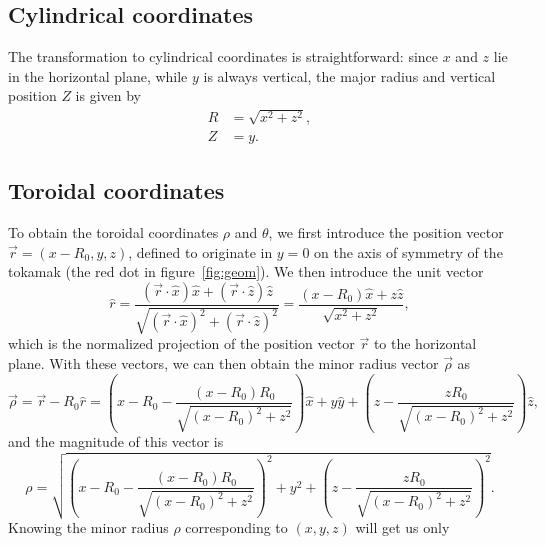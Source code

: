 \documentclass{notes}
\begin{document}
    \subsection{Cylindrical coordinates}
    The transformation to cylindrical coordinates is straightforward: since
    $x$ and $z$ lie in the horizontal plane, while $y$ is always vertical, the
    major radius and vertical position $Z$ is given by
    \begin{subequations}
        \begin{align}
        R &= \sqrt{x^2 + z^2},\\
        Z &= y.
        \end{align}
    \end{subequations}

    \subsection{Toroidal coordinates}
    To obtain the toroidal coordinates $\rho$ and $\theta$, we first introduce
    the position vector $\vec{r} = (x-R_0,y,z)$, defined to originate in $y=0$
    on the axis of symmetry of the tokamak (the red dot in
    figure~\ref{fig:geom}). We then introduce the unit vector
    \begin{equation}
        \hat{r} = \frac{\left(\vec{r}\cdot\hat{x}\right)\hat{x} + \left(\vec{r}\cdot\hat{z}\right)\hat{z}}
        {\sqrt{\left(\vec{r}\cdot\hat{x}\right)^2 + \left(\vec{r}\cdot\hat{z}\right)^2}} =
        \frac{(x-R_0)\hat{x} + z\hat{z}}{\sqrt{x^2+z^2}},
    \end{equation}
    which is the normalized projection of the position vector $\vec{r}$ to the
    horizontal plane. With these vectors, we can then obtain the minor radius
    vector $\vec{\rho}$ as
    \begin{equation}
        \vec{\rho} = \vec{r}-R_0\hat{r} =
        \left(x-R_0-\frac{(x-R_0)R_0}{\sqrt{\left(x-R_0\right)^2 + z^2}}\right)\hat{x}
        + y\hat{y}
        + \left(z-\frac{zR_0}{\sqrt{\left(x-R_0\right)^2 + z^2}}\right)\hat{z},
    \end{equation}
    and the magnitude of this vector is
    \begin{equation}
        \rho = \sqrt{
            \left(x-R_0-\frac{(x-R_0)R_0}{\sqrt{\left(x-R_0\right)^2 + z^2}}\right)^2
            + y^2
            + \left(z-\frac{zR_0}{\sqrt{\left(x-R_0\right)^2 + z^2}}\right)^2
        }.
    \end{equation}
    Knowing the minor radius $\rho$ corresponding to $(x,y,z)$ will get us only
\end{document}
